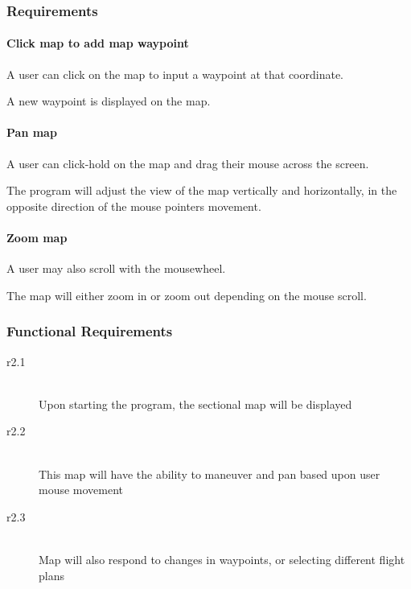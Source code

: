 \documentclass[12pt, letterpaper]{article}
\begin{document}
    \subsubsection{Requirements}
      \begin{description}
          \paragraph{Click map to add map waypoint}
        \item[Step 1] A user can click on the map to input a waypoint at that coordinate.
        \item[Step 2] A new waypoint is displayed on the map.
          \paragraph{Pan map}
        \item[Step 1] A user can click-hold on the map and drag their mouse across the screen.
        \item[Step 2] The program will adjust the view of the map vertically and horizontally,
			                  in the opposite direction of the mouse pointers movement.
        \paragraph{Zoom map}
        \item[Step 1] A user may also scroll with the mousewheel.
        \item[Step 2] The map will either zoom in or zoom out depending on the mouse scroll.
      \end{description}
    \subsubsection{Functional Requirements}
    \begin{description}
      \item[r2.1] \hfill \\ Upon starting the program, the sectional map will be displayed\\
      \item[r2.2] \hfill \\  This map will have the ability to maneuver and pan based upon user mouse movement\\
      \item[r2.3] \hfill \\  Map will also respond to changes in waypoints, or selecting different flight plans\\
  \end{description}
\end{document}
